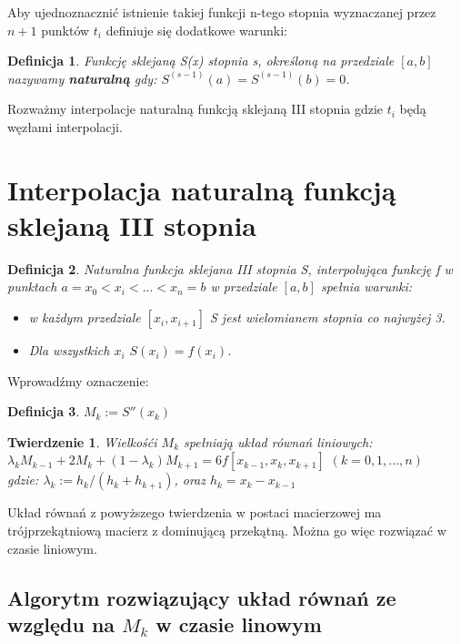 \documentclass{article}
\newtheorem{defi}{Definicja}
\newtheorem{twr}{Twierdzenie}
\begin{document}
\noindent Aby ujednoznacznić istnienie takiej funkcji n-tego stopnia wyznaczanej przez $n+1$ punktów $t_i$ definiuje się dodatkowe warunki:

\begin{defi}
	Funkcję sklejaną S(x) stopnia s, określoną na przedziale $[a,b]$
	nazywamy \textbf{naturalną} gdy:
	$S^{(s-1)}(a) = S^{(s-1)}(b) = 0$.
\end{defi}

Rozważmy interpolacje naturalną funkcją sklejaną III stopnia gdzie $t_i$ będą węzłami interpolacji.

\section{Interpolacja naturalną funkcją sklejaną III stopnia}

\begin{defi}
	Naturalna funkcja sklejana III stopnia S, interpolująca funkcję f w punktach $a = x_0 < x_i <...<x_n = b$ w przedziale $[a,b]$ spełnia warunki:
	
	\begin{itemize}
		\item w każdym przedziale $[x_i,x_{i+1}]$ S jest wielomianem stopnia co najwyżej 3.
		\item Dla wszystkich $x_i$ $S(x_i) = f(x_i)$.
	\end{itemize}
	
\end{defi}

\noindent Wprowadźmy oznaczenie:

\begin{defi}
	$M_k := S''(x_k)$
\end{defi}

\begin{twr}
	Wielkośći $M_k$ spełniają układ równań liniowych:\\
	$\lambda_k M_{k-1} + 2M_k + (1-\lambda_k) M_{k+1} = 6f[x_{k-1},x_k,x_{k+1}]$ \hfill $(k=0,1,...,n)$\\
	gdzie: $\lambda_k := h_k / ( h_k + h_{k+1})$, oraz $h_k = x_k - x_{k-1}$
\end{twr}
	
Układ równań z powyższego twierdzenia w postaci macierzowej ma trójprzekątniową macierz z dominującą przekątną. Można go więc rozwiązać w czasie liniowym.

\subsection{Algorytm rozwiązujący układ równań ze względu na $M_k$ w czasie linowym}
\end{document}
